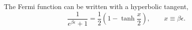 \documentclass{article}
\begin{document}
The Fermi function can be written with a hyperbolic tangent,
\begin{equation}
\frac{1}{e^{\beta\epsilon}+1} = \frac{1}{2}\left(1 - \tanh\frac{x}{2}\right), \qquad x \equiv \beta\epsilon .
\label{eq:fermi}
\end{equation}
\end{document}
